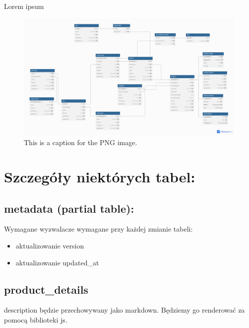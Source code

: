 




Lorem ipsum

\begin{figure}[h] %
    \centering %
    \includegraphics[width=1.0\textwidth]{diagram.png} %
    \caption{This is a caption for the PNG image.} %
    \label{fig:example} %
\end{figure}

\hfill \break
\section*{Szczegóły niektórych tabel:}

\subsection*{metadata (partial table):}
Wymagane wyzwalacze wymagane przy każdej zmianie tabeli:
\begin{itemize}
    \item {aktualizowanie version}
    \item {aktualizowanie updated\_at}
\end{itemize}

\subsection*{product\_details}
description będzie przechowywany jako markdown. Będziemy go renderować za pomocą biblioteki js.

